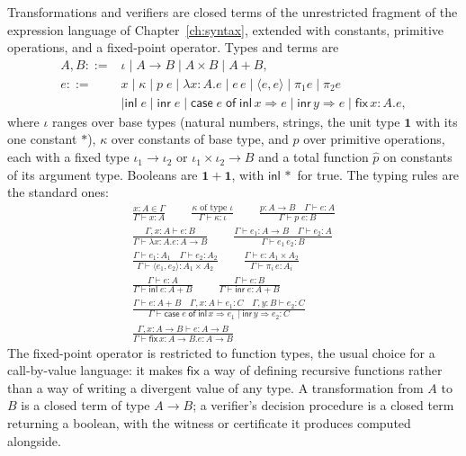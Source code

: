 \documentclass[11pt,openany]{book}
\theoremstyle{remark}
\begin{document}
Transformations and verifiers are closed terms of the unrestricted
fragment of the expression language of Chapter~\ref{ch:syntax}, extended
with constants, primitive operations, and a fixed-point operator. Types
and terms are
\[
\begin{aligned}
A,B ::= {}& \iota \mid A\to B \mid A\times B \mid A+B,\\
e ::= {}& x \mid \kappa \mid p\;e \mid \lambda x{:}A.e \mid e\,e
\mid \langle e,e\rangle \mid \pi_1 e \mid \pi_2 e\\
&\mid \mathsf{inl}\;e \mid \mathsf{inr}\;e
\mid \mathsf{case}\;e\;\mathsf{of}\;\mathsf{inl}\,x\Rightarrow e\mid
\mathsf{inr}\,y\Rightarrow e
\mid \mathsf{fix}\,x{:}A.e,
\end{aligned}
\]
where $\iota$ ranges over base types (natural numbers, strings, the unit
type $\mathbf 1$ with its one constant $\ast$), $\kappa$ over constants of
base type, and $p$ over primitive operations, each with a fixed type
$\iota_1\to\iota_2$ or $\iota_1\times\iota_2\to B$ and a total function
$\hat p$ on constants of its argument type. Booleans are $\mathbf
1+\mathbf 1$, with $\mathsf{inl}\,\ast$ for true. The typing rules are the
standard ones:
{\small
\[
\begin{gathered}
\frac{x{:}A\in\Gamma}{\Gamma\vdash x:A}
\qquad
\frac{\kappa\text{ of type }\iota}{\Gamma\vdash\kappa:\iota}
\qquad
\frac{p:A\to B\quad\Gamma\vdash e:A}{\Gamma\vdash p\;e:B}
\\[1.2ex]
\frac{\Gamma,x{:}A\vdash e:B}{\Gamma\vdash\lambda x{:}A.e:A\to B}
\qquad
\frac{\Gamma\vdash e_1:A\to B\quad\Gamma\vdash e_2:A}{\Gamma\vdash e_1\,e_2:B}
\\[1.2ex]
\frac{\Gamma\vdash e_1:A_1\quad\Gamma\vdash e_2:A_2}
{\Gamma\vdash\langle e_1,e_2\rangle:A_1\times A_2}
\qquad
\frac{\Gamma\vdash e:A_1\times A_2}{\Gamma\vdash\pi_i\,e:A_i}
\\[1.2ex]
\frac{\Gamma\vdash e:A}{\Gamma\vdash\mathsf{inl}\;e:A+B}
\qquad
\frac{\Gamma\vdash e:B}{\Gamma\vdash\mathsf{inr}\;e:A+B}
\\[1.2ex]
\frac{\Gamma\vdash e:A+B\quad\Gamma,x{:}A\vdash e_1:C\quad
\Gamma,y{:}B\vdash e_2:C}
{\Gamma\vdash\mathsf{case}\;e\;\mathsf{of}\;\mathsf{inl}\,x\Rightarrow
e_1\mid\mathsf{inr}\,y\Rightarrow e_2:C}
\\[1.2ex]
\frac{\Gamma,x{:}A\to B\vdash e:A\to B}{\Gamma\vdash\mathsf{fix}\,x{:}A\to
B.e:A\to B}
\end{gathered}
\]
}
The fixed-point operator is restricted to function types, the usual
choice for a call-by-value language: it makes $\mathsf{fix}$ a way of
defining recursive functions rather than a way of writing a divergent
value of any type. A transformation from $A$ to $B$ is a closed term of
type $A\to B$; a verifier's decision procedure is a closed term returning
a boolean, with the witness or certificate it produces computed alongside.
\end{document}
